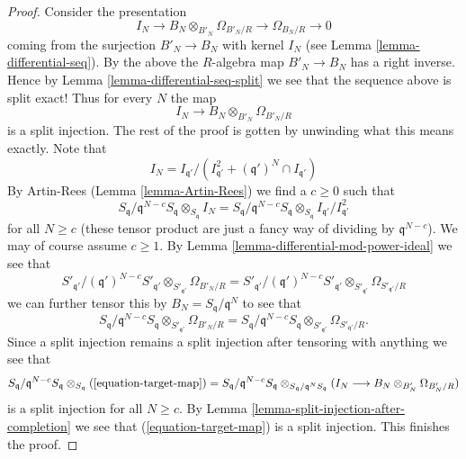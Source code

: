 \begin{proof}
\medskip\noindent
Consider the presentation
$$
I_N \to B_N \otimes_{B'_N} \Omega_{B'_N/R} \to \Omega_{B_N/R} \to 0
$$
coming from the surjection $B'_N \to B_N$ with kernel $I_N$ (see
Lemma \ref{lemma-differential-seq}). By the above the $R$-algebra map
$B'_N \to B_N$ has a right inverse. Hence by
Lemma \ref{lemma-differential-seq-split} we see that the sequence above
is split exact! Thus for every $N$ the map
$$
I_N \longrightarrow B_N \otimes_{B'_N} \Omega_{B'_N/R}
$$
is a split injection. The rest of the proof is gotten by unwinding what
this means exactly. Note that
$$
I_N = I_{\mathfrak q'}/
(I_{\mathfrak q'}^2 + (\mathfrak q')^N \cap I_{\mathfrak q'})
$$
By Artin-Rees (Lemma \ref{lemma-Artin-Rees}) we find a $c \geq 0$
such that
$$
S_{\mathfrak q}/\mathfrak q^{N - c}S_{\mathfrak q}
\otimes_{S_{\mathfrak q}} I_N =
S_{\mathfrak q}/\mathfrak q^{N - c}S_{\mathfrak q}
\otimes_{S_{\mathfrak q}}
I_{\mathfrak q'}/I_{\mathfrak q'}^2
$$
for all $N \geq c$
(these tensor product are just a fancy way of dividing by
$\mathfrak q^{N - c}$). We may of course assume $c \geq 1$.
By Lemma \ref{lemma-differential-mod-power-ideal} we see that
$$
S'_{\mathfrak q'}/(\mathfrak q')^{N - c}S'_{\mathfrak q'}
\otimes_{S'_{\mathfrak q'}} \Omega_{B'_N/R} =
S'_{\mathfrak q'}/(\mathfrak q')^{N - c}S'_{\mathfrak q'}
\otimes_{S'_{\mathfrak q'}} \Omega_{S'_{\mathfrak q'}/R}
$$
we can further tensor this by $B_N = S_{\mathfrak q}/\mathfrak q^N$
to see that
$$
S_{\mathfrak q}/\mathfrak q^{N - c}S_{\mathfrak q}
\otimes_{S'_{\mathfrak q'}} \Omega_{B'_N/R} =
S_{\mathfrak q}/\mathfrak q^{N - c}S_{\mathfrak q}
\otimes_{S'_{\mathfrak q'}} \Omega_{S'_{\mathfrak q'}/R}.
$$
Since a split injection remains a split injection after tensoring
with anything we see that
$$
S_{\mathfrak q}/\mathfrak q^{N - c}S_{\mathfrak q}
\otimes_{S_{\mathfrak q}}
(\ref{equation-target-map}) =
S_{\mathfrak q}/\mathfrak q^{N - c}S_{\mathfrak q}
\otimes_{S_{\mathfrak q}/\mathfrak q^N S_{\mathfrak q}}
(I_N \longrightarrow B_N \otimes_{B'_N} \Omega_{B'_N/R})
$$
is a split injection for all $N \geq c$. By
Lemma \ref{lemma-split-injection-after-completion} we see that
(\ref{equation-target-map}) is a split injection. This finishes the proof.
\end{proof}
